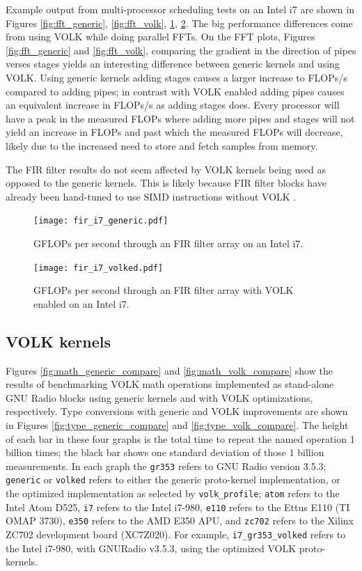 \documentclass[english]{article}
\begin{document}
Example output from multi-processor scheduling tests on an Intel i7 are shown in Figures \ref{fig:fft_generic}, \ref{fig:fft_volk}, \ref{fig:fir_generic}, \ref{fig:fir_volk}. 
The big performance differences come from using VOLK while doing parallel FFTs. 
On the FFT plots, Figures \ref{fig:fft_generic} and \ref{fig:fft_volk}, comparing the gradient in the direction of pipes verses stages yields an interesting difference between generic kernels and using VOLK.
Using generic kernels adding stages causes a larger increase to FLOPs/s compared to adding pipes; in contrast with VOLK enabled adding pipes causes an equivalent increase in FLOPs/s as adding stages does. 
Every processor will have a peak in the measured FLOPs where adding more pipes and stages will not yield an increase in FLOPs and past which the measured FLOPs will decrease, likely due to the increased need to store and fetch samples from memory. 

The FIR filter results do not seem affected by VOLK kernels being used as opposed to the generic kernels. 
This is likely because FIR filter blocks have already been hand-tuned to use SIMD instructions without VOLK \cite{gnu-list}. 

\begin{figure}[htbp]
    \centering
    \texttt{[image: fir\_i7\_generic.pdf]}
    \caption{GFLOPs per second through an FIR filter array on an Intel i7.}
    \label{fig:fir_generic}
\end{figure}

\begin{figure}[htbp]
    \centering
    \texttt{[image: fir\_i7\_volked.pdf]}
    \caption{GFLOPs per second through an FIR filter array with VOLK enabled on an Intel i7.}
    \label{fig:fir_volk}
\end{figure}




\subsection{VOLK kernels}

Figures \ref{fig:math_generic_compare} and \ref{fig:math_volk_compare} show the results of benchmarking VOLK math operations implemented as stand-alone GNU Radio blocks using generic kernels and with VOLK optimizations, respectively.
Type conversions with generic and VOLK improvements are shown in Figures \ref{fig:type_generic_compare} and \ref{fig:type_volk_compare}. 
The height of each bar in these four graphs is the total time to repeat the named operation 1 billion times; the black bar shows one standard deviation of those 1 billion measurements.
In each graph the \texttt{gr353} refers to GNU Radio version 3.5.3; \texttt{generic} or \texttt{volked} refers to either the generic proto-kernel implementation, or the optimized implementation as selected by \texttt{volk\_profile}; \texttt{atom} refers to the Intel Atom D525, \texttt{i7} refers to the Intel i7-980, \texttt{e110} refers to the Ettus E110 (TI OMAP 3730), \texttt{e350} refers to the AMD E350 APU, and \texttt{zc702} refers to the Xilinx ZC702 development board (XC7Z020).
For example, \texttt{i7\_gr353\_volked} refers to the Intel i7-980, with GNURadio v3.5.3, using the optimized VOLK proto-kernels.
\end{document}
